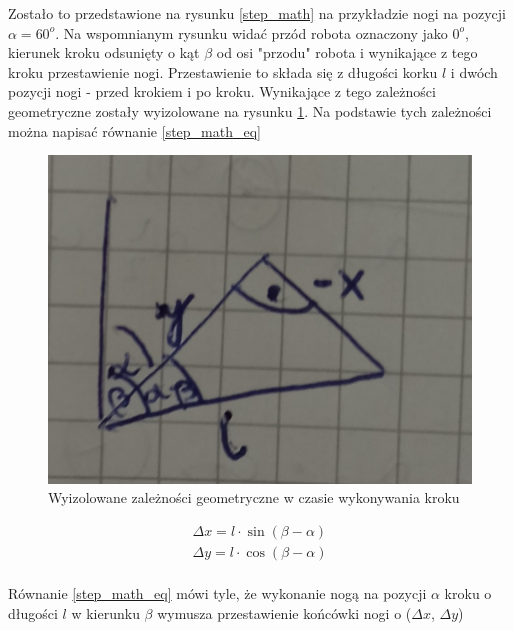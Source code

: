 Zostało to przedstawione na rysunku \ref{step_math} na przykładzie nogi na pozycji $\alpha = 60^o$. Na wspomnianym rysunku widać przód robota oznaczony jako $0^o$, kierunek kroku odsunięty o kąt $\beta$ od osi "przodu" robota i wynikające z tego kroku przestawienie nogi. Przestawienie to składa się z długości korku $l$ i dwóch pozycji nogi - przed krokiem i po kroku. Wynikające z tego zależności geometryczne zostały wyizolowane na rysunku \ref{step_math_isolated}. Na podstawie tych zależności można napisać równanie \ref{step_math_eq}

\begin{figure}[h!]
\includegraphics[width=\textwidth]{img/step_math_isolated.jpg}
\caption{Wyizolowane zależności geometryczne w czasie wykonywania kroku}
\label{step_math_isolated}
\end{figure}



\begin{equation} \label{step_math_eq}
\begin{split}
\Delta x = l \cdot \sin(\beta - \alpha)\\
\Delta y = l \cdot \cos(\beta - \alpha)\\
\end{split}
\end{equation}

Równanie \ref{step_math_eq} mówi tyle, że wykonanie nogą na pozycji $\alpha$ kroku o długości $l$ w kierunku $\beta$ wymusza przestawienie końcówki nogi o ($\Delta x$, $\Delta y$)


